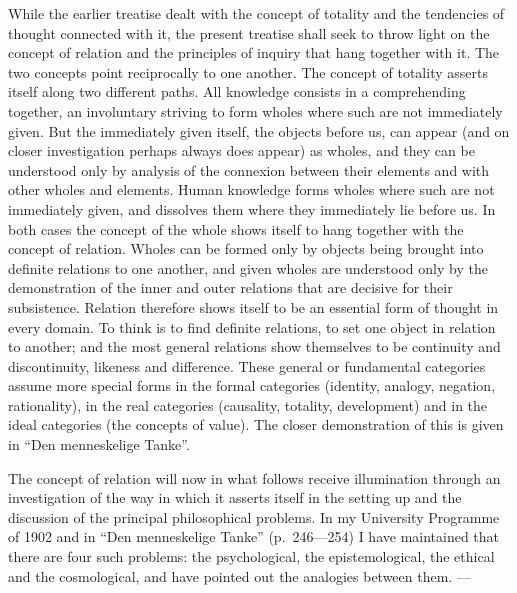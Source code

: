 \documentclass[12pt]{article}
\newcommand{\opage}[1]{\marginnote{\footnotesize\textit{[#1]}}}
\begin{document}
While the earlier treatise dealt with the concept of totality and the
tendencies of thought connected with it, the present treatise shall seek to
throw light on the concept of relation and the principles of inquiry that
hang together with it. The two concepts point reciprocally to one another.
The concept of totality asserts itself along two different paths. All
knowledge consists in a comprehending together, an involuntary striving to
form wholes where such are not immediately given. But the immediately given
itself, the objects before us, can appear (and on closer investigation
perhaps always does appear) as wholes, and they can be understood only by
analysis of the connexion between their elements and with other wholes and
elements. Human knowledge forms wholes where such are not immediately given,
and dissolves them where they immediately lie before us. In both cases the
concept of the whole shows itself to hang together with the concept of
relation. Wholes can be formed only by objects being brought into definite
relations to one another, and given wholes are understood only by the
demonstration of the inner and outer \opage{5}relations that are decisive for their
subsistence. Relation therefore shows itself to be an essential form of
thought in every domain. To think is to find definite relations, to set one
object in relation to another; and the most general relations show
themselves to be continuity and discontinuity, likeness and difference.
These general or fundamental categories assume more special forms in the
formal categories (identity, analogy, negation, rationality), in the real
categories (causality, totality, development) and in the ideal categories
(the concepts of value). The closer demonstration of this is given in ``Den
menneskelige Tanke''.

The concept of relation will now in what follows receive illumination
through an investigation of the way in which it asserts itself in the
setting up and the discussion of the principal philosophical problems. In my
University Programme of 1902 and in ``Den menneskelige Tanke''
(p.~246---254) I have maintained that there are four such problems: the
psychological, the epistemological, the ethical and the cosmological, and
have pointed out the analogies between them. ---
\end{document}

